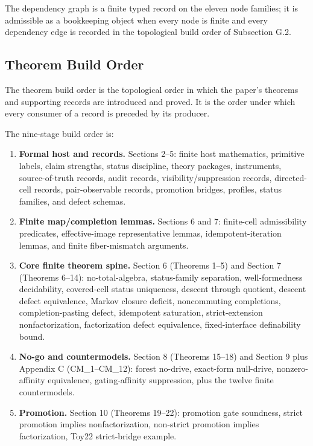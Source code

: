 \documentclass[11pt]{article}
\providecommand{\tightlist}{}
\theoremstyle{definition}
\begin{document}
The dependency graph is a finite typed record on the eleven node families; it is admissible as a bookkeeping object when every node is finite and every dependency edge is recorded in the topological build order of Subsection G.2.

\subsection{Theorem Build Order}

The theorem build order is the topological order in which the paper's theorems and supporting records are introduced and proved. It is the order under which every consumer of a record is preceded by its producer.

The nine-stage build order is:

\begin{enumerate}
\def\labelenumi{\arabic{enumi}.}
\tightlist
\item
  \textbf{Formal host and records.} Sections 2--5: finite host mathematics, primitive labels, claim strengths, status discipline, theory packages, instruments, source-of-truth records, audit records, visibility/suppression records, directed-cell records, pair-observable records, promotion bridges, profiles, status families, and defect schemas.
\item
  \textbf{Finite map/completion lemmas.} Sections 6 and 7: finite-cell admissibility predicates, effective-image representative lemmas, idempotent-iteration lemmas, and finite fiber-mismatch arguments.
\item
  \textbf{Core finite theorem spine.} Section 6 (Theorems 1--5) and Section 7 (Theorems 6--14): no-total-algebra, status-family separation, well-formedness decidability, covered-cell status uniqueness, descent through quotient, descent defect equivalence, Markov closure deficit, noncommuting completions, completion-pasting defect, idempotent saturation, strict-extension nonfactorization, factorization defect equivalence, fixed-interface definability bound.
\item
  \textbf{No-go and countermodels.} Section 8 (Theorems 15--18) and Section 9 plus Appendix C (CM\_1--CM\_12): forest no-drive, exact-form null-drive, nonzero-affinity equivalence, gating-affinity suppression, plus the twelve finite countermodels.
\item
  \textbf{Promotion.} Section 10 (Theorems 19--22): promotion gate soundness, strict promotion implies nonfactorization, non-strict promotion implies factorization, Toy22 strict-bridge example.

\end{enumerate}
\end{document}
